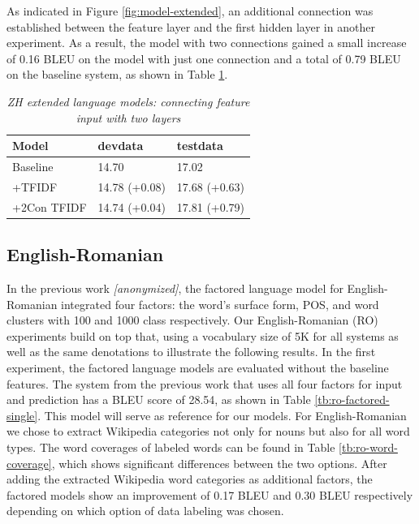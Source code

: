 \documentclass[a4paper]{article}
\newcommand{\anony}[1]{\textit{[anonymized]}}
\begin{document}
As indicated in Figure \ref{fig:model-extended}, an additional connection was established between the feature layer and the first hidden layer in another experiment. As a result, the model with two connections gained a small increase of 0.16 BLEU on the model with just one connection and a total of 0.79 BLEU on the baseline system, as shown in Table \ref{tb:zh-extended-both}.


\begin{table}
\caption{\it ZH extended language models: connecting feature input with two layers}
\vspace{2mm}
\centering
  \begin{tabular}{lll}
  	\hline
  	Model       & devdata       & testdata      \\ \hline\hline
  	Baseline    & 14.70         & 17.02         \\ \hline
  	+TFIDF      & 14.78 (+0.08) & 17.68 (+0.63) \\
  	+2Con TFIDF & 14.74 (+0.04) & 17.81 (+0.79)
  \end{tabular}
  \label{tb:zh-extended-both}
\end{table}


\subsection{English-Romanian}
In the previous work \anony{\cite{niehuesusing}}, the factored language model for English-Romanian integrated four factors: the word's surface form, POS, and word clusters with 100 and 1000 class respectively. Our English-Romanian (RO) experiments build on top that, using a vocabulary size of 5K for all systems as well as the same denotations to illustrate the following results. In the first experiment, the factored language models are evaluated without the baseline features. The system from the previous work that uses all four factors for input and prediction has a BLEU score of 28.54, as shown in Table \ref{tb:ro-factored-single}. This model will serve as reference for our models. For English-Romanian we chose to extract Wikipedia categories not only for nouns but also for all word types. The word coverages of labeled words can be found in Table \ref{tb:ro-word-coverage}, which shows significant differences between the two options.
After adding the extracted Wikipedia word categories as additional factors, the factored models show an improvement of 0.17 BLEU and 0.30 BLEU respectively depending on which option of data labeling was chosen.
\end{document}
